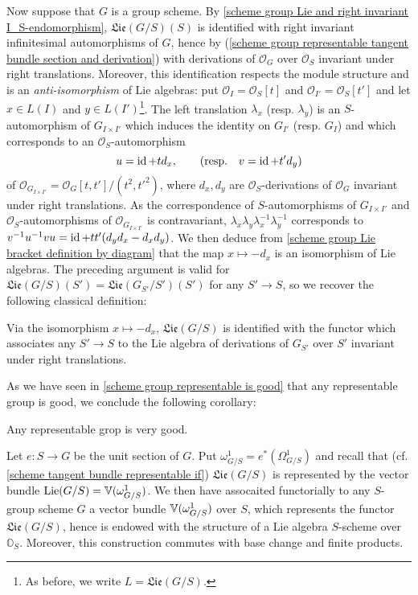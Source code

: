 Now suppose that $G$ is a group scheme. By \cref{scheme group Lie and right invariant I_S-endomorphism}, $\mathfrak{Lie}(G/S)(S)$ is identified with right invariant infinitesimal automorphisms of $G$, hence by (\ref{scheme group representable tangent bundle section and derivation}) with derivations of $\mathscr{O}_G$ over $\mathscr{O}_S$ invariant under right translations. Moreover, this identification respects the module structure and is an \textit{anti-isomorphism} of Lie algebras: put $\mathscr{O}_I=\mathscr{O}_S[t]$ and $\mathscr{O}_{I'}=\mathscr{O}_S[t']$ and let $x\in L(I)$ and $y\in L(I')$\footnote{As before, we write $L=\mathfrak{Lie}(G/S)$.}. The left translation $\lambda_x$ (resp. $\lambda_y$) is an $S$-automorphism of $G_{I\times I'}$ which induces the identity on $G_{I'}$ (resp. $G_I$) and which corresponds to an $\mathscr{O}_S$-automorphism
\[u=\operatorname{id}+td_x,\quad\quad (\text{resp.}\quad v=\operatorname{id}+t'd_y)\]
of $\mathscr{O}_{G_{I\times I'}}=\mathscr{O}_G[t,t']/(t^2,t'^2)$, where $d_x,d_y$ are $\mathscr{O}_S$-derivations of $\mathscr{O}_G$ invariant under right translations. As the correspondence of $S$-automorphisms of $G_{I\times I'}$ and $\mathscr{O}_S$-automorphisms of $\mathscr{O}_{G_{I\times I'}}$ is contravariant, $\lambda_x\lambda_y\lambda_x^{-1}\lambda_y^{-1}$ corresponds to $v^{-1}u^{-1}vu=\operatorname{id}+tt'(d_yd_x-d_xd_y)$. We then deduce from \cref{scheme group Lie bracket definition by diagram} that the map $x\mapsto-d_x$ is an isomorphism of Lie algebras. The preceding argument is valid for $\mathfrak{Lie}(G/S)(S')=\mathfrak{Lie}(G_{S'}/S')(S')$ for any $S'\to S$, so we recover the following classical definition:

\begin{proposition}\label{scheme group scheme Lie algebra isomorphic to derivation}
Via the isomorphism $x\mapsto -d_x$, $\mathfrak{Lie}(G/S)$ is identified with the functor which associates any $S'\to S$ to the Lie algebra of derivations of $G_{S'}$ over $S'$ invariant under right translations.
\end{proposition}

As we have seen in \cref{scheme group representable is good} that any representable group is good, we conclude the following corollary:

\begin{corollary}\label{scheme group representable is very good}
Any representable grop is very good.
\end{corollary}

Let $e:S\to G$ be the unit section of $G$. Put $\omega_{G/S}^1=e^*(\Omega_{G/S}^1)$ and recall that (cf. \cref{scheme tangent bundle representable if}) $\mathfrak{Lie}(G/S)$ is represented by the vector bundle $\mathrm{Lie}(G/S)=\mathbb{V}(\omega_{G/S}^1)$. We then have assocaited functorially to any $S$-group scheme $G$ a vector bundle $\mathbb{V}(\omega_{G/S}^1)$ over $S$, which represents the functor $\mathfrak{Lie}(G/S)$, hence is endowed with the structure of a Lie algebra $S$-scheme over $\mathbb{O}_S$. Moreover, this construction commutes with base change and finite products.

